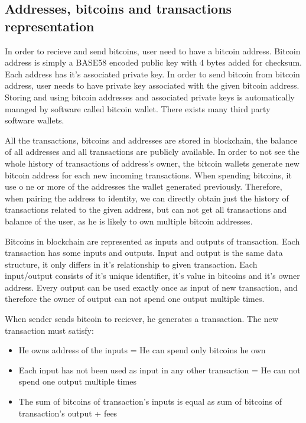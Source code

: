 \documentclass[
  digital, %
  table,   %
  lof,     %
  lot,     %
  oneside
]{fithesis3}
\begin{document}
\subsection{Addresses, bitcoins and transactions representation}
In order to recieve and send bitcoins, user need to have a bitcoin address.
Bitcoin address is simply a BASE58 encoded public key with 4 bytes added for checksum.
Each address has it's associated private key.
In order to send bitcoin from bitcoin address, user needs to have private key associated with the given bitcoin address.
Storing and using bitcoin addresses and associated private keys is automatically managed
by software called bitcoin wallet. There exists many third party software wallets.

All the transactions, bitcoins and addresses are stored in blockchain,
the balance of all addresses and all transactions are publicly available.
In order to not see the whole history of transactions of address's owner,
the bitcoin wallets generate new bitcoin address for each new incoming transactions. When spending bitcoins, it use o
ne or more of the addresses the wallet generated previously.
Therefore, when pairing the address to identity, we can directly obtain just the history of transactions related to the given
address, but can not get all transactions and balance of the user, as he is likely to own multiple bitcoin addresses.

Bitcoins in blockchain are represented as inputs and outputs of transaction.
Each transaction has some inputs and outputs. 
Input and output is the same data structure, it only differs in it's relationship to given transaction.
Each input/output consists of it's unique identifier, it's value in bitcoins and it's owner address.
Every output can be used exactly once as input of new transaction, and therefore the owner of output can not
spend one output multiple times.

When sender sends bitcoin to reciever, he generates a transaction.
The new transaction must satisfy:
\begin{itemize}
  \item He owns address of the inputs = He can spend only bitcoins he own
  \item Each input has not been used as input in any other transaction = He can not spend one output multiple times
  \item The sum of bitcoins of transaction's inputs is equal as sum of bitcoins of transaction's output + fees
\end{itemize}
\end{document}
